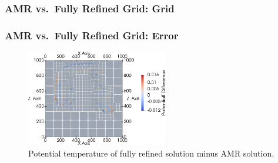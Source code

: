 \documentclass[aspectratio=169]{beamer}
\begin{document}
\begin{frame}
  \frametitle{AMR vs.\ Fully Refined Grid: Grid}
  \begin{center}
  \end{center}
\end{frame}

\begin{frame}
  \frametitle{AMR vs.\ Fully Refined Grid: Error}
  \begin{figure}[H]
     \centering
\includegraphics[width=0.55\textwidth]{ppam_two_bubbles_amr_error}
 \caption*{Potential temperature of fully refined solution minus AMR solution.}
   \end{figure}
\end{frame}
\end{document}
